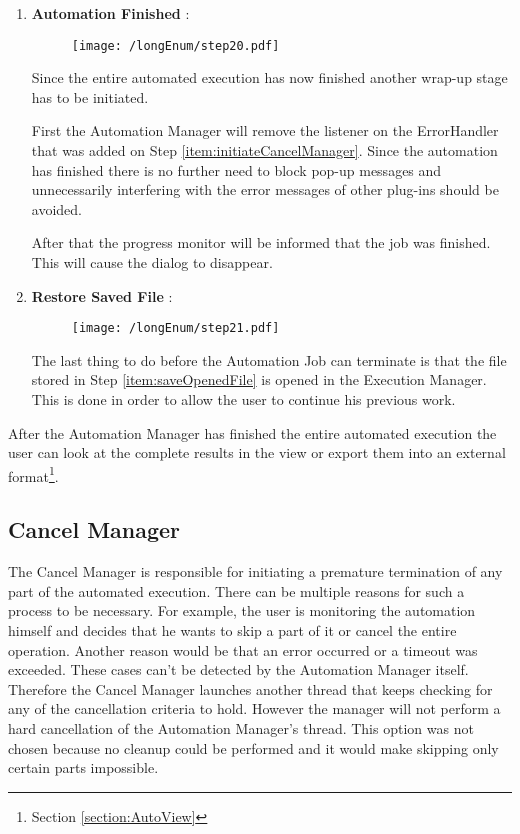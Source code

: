 \begin{enumerate}
 \item \label{item:automationDone} \textbf{Automation Finished} :
\begin{figure}[H]
  \centering
  \texttt{[image: /longEnum/step20.pdf]}
\end{figure}
Since the entire automated execution has now finished another wrap-up
stage has to be initiated. 

First the Automation Manager will remove the listener on the ErrorHandler that was added on Step
\ref{item:initiateCancelManager}. Since the automation has finished there is no further need to block
pop-up messages and unnecessarily interfering with the error messages of other plug-ins should be
avoided.

After that the progress monitor will be informed that the job was finished. This will cause the 
dialog to disappear.

 \item \label{item:restoreFile} \textbf{Restore Saved File} :
\begin{figure}[H]
  \centering
  \texttt{[image: /longEnum/step21.pdf]}
\end{figure}
The last thing to do before the Automation Job can terminate is
that the file stored in Step \ref{item:saveOpenedFile} is opened in the Execution Manager. This is
done in order to allow the user to continue his previous work.
\end{enumerate}

After the Automation Manager has finished the entire automated execution the user can look at
the complete results in the view or export them into an external format\footnote{Section \ref{section:AutoView}}.

\subsection{Cancel Manager}
\label{section:CancelManager}
The Cancel Manager is responsible for initiating a premature termination of any part of
the automated execution. There can be multiple reasons for such a process to be necessary.
For example, the user is monitoring the automation himself and decides that he wants to
skip a part of it or cancel the entire operation. Another reason would be that an error
occurred or a timeout was exceeded. These cases can't be detected by the
Automation Manager itself. Therefore the Cancel Manager launches another thread that
keeps checking for any of the cancellation criteria to hold. However the manager will
not perform a hard cancellation of the Automation Manager's thread. This option was not
chosen because no cleanup could be performed and it would make skipping only certain parts impossible.

